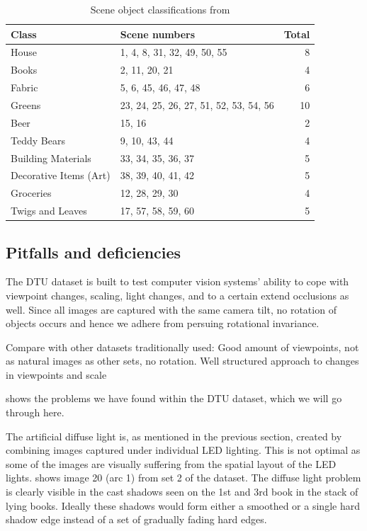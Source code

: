 \documentclass[thesis.tex]{subfiles}
\begin{document}
\begin{table}
	\centering
	\begin{tabular}{l l r}
		\toprule
		Class & Scene numbers & Total \\
		\midrule
		House					& 1, 4, 8, 31, 32, 49, 50, 55				& 8 \\
		Books					& 2, 11, 20, 21								& 4 \\
		Fabric					& 5, 6, 45, 46, 47, 48						& 6 \\
		Greens					& 23, 24, 25, 26, 27, 51, 52, 53, 54, 56	& 10 \\
		Beer  					& 15, 16									& 2 \\
		Teddy Bears 			& 9, 10, 43, 44								& 4 \\
		Building Materials 		& 33, 34, 35, 36, 37						& 5 \\
		Decorative Items (Art) 	& 38, 39, 40, 41, 42						& 5 \\
		Groceries 				& 12, 28, 29, 30							& 4 \\
		Twigs and Leaves 		& 17, 57, 58, 59, 60 						& 5 \\
		\bottomrule
	\end{tabular}
	\caption{Scene object classifications from \cite[Table 1]{aanaes2010ground}}
	\label{tbl:dtu_scene_classifications}
\end{table}
%

\subsection{Pitfalls and deficiencies}
The DTU dataset is built to test computer vision systems' ability to cope with viewpoint changes, scaling, light changes, and to a certain extend occlusions as well. Since all images are captured with the same camera tilt, no rotation of objects occurs and hence we adhere from persuing rotational invariance.

Compare with other datasets traditionally used: Good amount of viewpoints, not as natural images as other sets, no rotation. Well structured approach to changes in viewpoints and scale

 shows the problems we have found within the DTU dataset, which we will go through here.

The artificial diffuse light is, as mentioned in the previous section, created by combining images captured under individual LED lighting. This is not optimal as some of the images are visually suffering from the spatial layout of the LED lights.  shows image 20 (arc 1) from set 2 of the dataset. The diffuse light problem is clearly visible in the cast shadows seen on the 1st and 3rd book in the stack of lying books. Ideally these shadows would form either a smoothed or a single hard shadow edge instead of a set of gradually fading hard edges.
\end{document}
